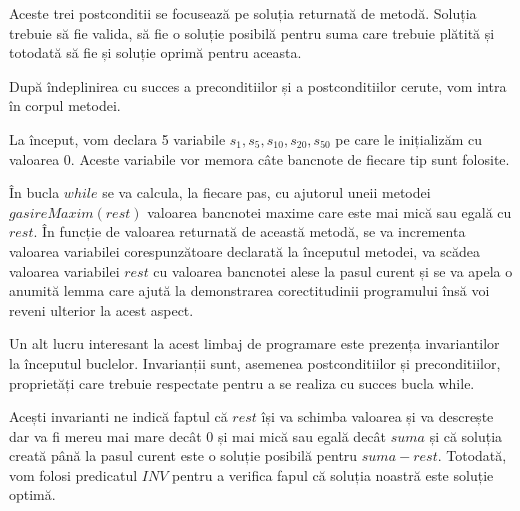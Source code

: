 \par
\vspace{0.25cm}
Aceste trei postconditii se focusează pe soluția returnată de metodă. Soluția trebuie să fie valida, să fie o soluție posibilă pentru suma care trebuie plătită și totodată să fie și soluție oprimă pentru aceasta.
\par 
După îndeplinirea cu succes a preconditiilor și a postconditiilor cerute, vom intra în corpul metodei. \par 
La început, vom declara 5 variabile $s_1, s_5 , s_{10}, s_{20}, s_{50}$ pe care le inițializăm cu valoarea 0. Aceste variabile vor memora câte bancnote de fiecare tip sunt folosite. \par 
În bucla $while$ se va calcula, la fiecare pas, cu ajutorul uneii metodei \\ $gasireMaxim(rest)$ valoarea bancnotei maxime care este mai mică sau egală cu $rest$. În funcție de valoarea returnată de această metodă, se va incrementa valoarea variabilei corespunzătoare declarată la începutul metodei, va scădea valoarea variabilei $rest$ cu valoarea bancnotei alese la pasul curent și se va apela o anumită lemma care ajută la demonstrarea corectitudinii programului însă voi reveni ulterior la acest aspect.
\par 

Un alt lucru interesant la acest limbaj de programare este prezența invariantilor la începutul buclelor. Invarianții sunt, asemenea postconditiilor și preconditiilor, proprietăți care trebuie respectate pentru a se realiza cu succes bucla while.

\vspace{0.5cm}
\par 
\vspace{0.5cm}
Acești invarianti ne indică faptul că $rest$ își va schimba valoarea și va descrește dar va fi mereu mai mare decât 0 și mai mică sau egală decât $suma$ și că soluția creată până la pasul curent este o soluție posibilă pentru $suma-rest$. 
Totodată, vom folosi predicatul $INV$ pentru a verifica fapul că soluția noastră este soluție optimă. 
\par
